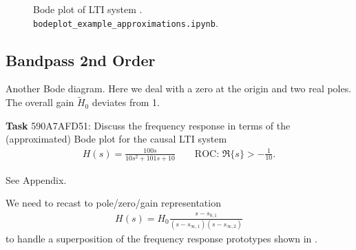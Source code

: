 \begin{figure}[h!]
\centering
{}

\caption{Bode plot of LTI system .
\texttt{bodeplot\_example\_approximations.ipynb}.}
\label{fig:bodeplot_example_approximations_44EB4169E9}
\end{figure}





\clearpage
\subsection{Bandpass 2nd Order}
\label{sec:590A7AFD51}
\begin{Ziel}
Another Bode diagram. Here we deal with a zero at the origin and two real
poles. The overall gain $\tilde{H}_0$ deviates from 1.
\end{Ziel}
\textbf{Task} {\tiny 590A7AFD51}: Discuss the frequency response in terms
of the (approximated) Bode plot for the causal LTI system
\begin{align}
H(s) = \frac{100 s}{10 s^2 + 101 s + 10}\qquad\text{ROC: }
\Re\{s\}>-\frac{1}{10}.
\end{align}
\begin{Werkzeug}
See Appendix.
\end{Werkzeug}
\begin{Ansatz}
We need to recast to pole/zero/gain representation
\begin{align}
H(s) = H_0\frac{s-s_{0,1}}{(s-s_{\infty,1})(s-s_{\infty,2})}
\end{align}
to handle a superposition of the frequency response prototypes shown in
.
\end{Ansatz}

